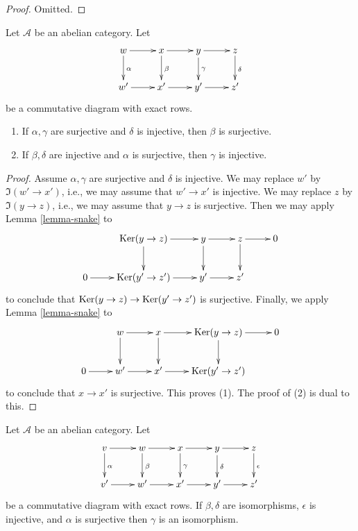 \begin{proof}
Omitted.
\end{proof}

\begin{lemma}
\label{lemma-four-lemma}
Let $\mathcal{A}$ be an abelian category. Let
$$
\xymatrix{
w \ar[r] \ar[d]^\alpha & x \ar[r] \ar[d]^\beta & y \ar[r] \ar[d]^\gamma &
z \ar[d]^\delta \\
w' \ar[r] & x' \ar[r] & y' \ar[r] & z'
}
$$
be a commutative diagram with exact rows.
\begin{enumerate}
\item If $\alpha, \gamma$ are surjective and $\delta$ is injective, then
$\beta$ is surjective.
\item If $\beta, \delta$ are injective and $\alpha$ is surjective, then
$\gamma$ is injective.
\end{enumerate}
\end{lemma}

\begin{proof}
Assume $\alpha, \gamma$ are surjective and $\delta$ is injective.
We may replace $w'$ by $\Im(w' \to x')$, i.e., we may assume
that $w' \to x'$ is injective.
We may replace $z$ by $\Im(y \to z)$, i.e., we may assume that
$y \to z$ is surjective. Then we may apply
Lemma \ref{lemma-snake}
to
$$
\xymatrix{
& \Ker(y \to z) \ar[r] \ar[d] & y \ar[r] \ar[d] & z \ar[r] \ar[d] & 0 \\
0 \ar[r] & \Ker(y' \to z') \ar[r] & y' \ar[r] & z'
}
$$
to conclude that $\mathop{\mathrm{Ker}}(y \to z) \to \mathop{\mathrm{Ker}}(y' \to z')$ is
surjective. Finally, we apply
Lemma \ref{lemma-snake}
to
$$
\xymatrix{
& w \ar[r] \ar[d] & x \ar[r] \ar[d] & \Ker(y \to z) \ar[r] \ar[d] & 0 \\
0 \ar[r] & w' \ar[r] & x' \ar[r] & \Ker(y' \to z')
}
$$
to conclude that $x \to x'$ is surjective. This proves (1). The proof
of (2) is dual to this.
\end{proof}

\begin{lemma}
\label{lemma-five-lemma}
\begin{reference}
\cite[Lemma 4.5 page 16]{Eilenberg-Steenrod}
\end{reference}
Let $\mathcal{A}$ be an abelian category. Let
$$
\xymatrix{
v \ar[r] \ar[d]^\alpha &
w \ar[r] \ar[d]^\beta &
x \ar[r] \ar[d]^\gamma &
y \ar[r] \ar[d]^\delta &
z \ar[d]^\epsilon \\
v' \ar[r] & w' \ar[r] & x' \ar[r] & y' \ar[r] & z'
}
$$
be a commutative diagram with exact rows. If $\beta, \delta$
are isomorphisms, $\epsilon$ is injective, and $\alpha$ is surjective
then $\gamma$ is an isomorphism.
\end{lemma}

